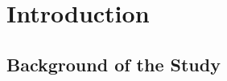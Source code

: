 %
%
%                 

\chapter{Introduction}
\label{sec:intro}    %




\section{Background of the Study}
\label{sec:overview}

%
%










